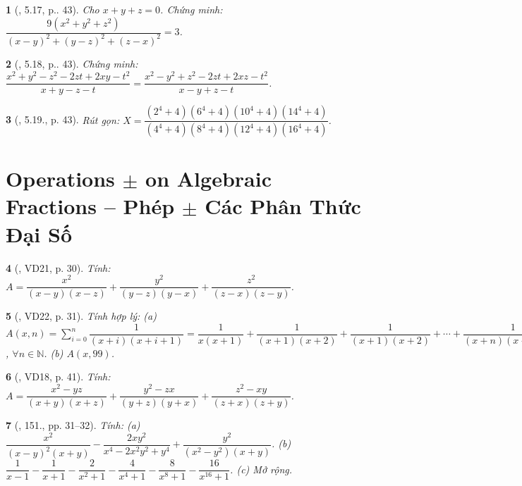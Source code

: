 \documentclass{article}
\newtheorem{baitoan}{}
\begin{document}
\begin{baitoan}[\cite{TLCT_THCS_Toan_8_dai_so}, 5.17, p.. 43]
	Cho $x + y + z = 0$. Chứng minh: $\dfrac{9(x^2 + y^2 + z^2)}{(x - y)^2 + (y - z)^2 + (z - x)^2} = 3$.
\end{baitoan}

\begin{baitoan}[\cite{TLCT_THCS_Toan_8_dai_so}, 5.18, p.. 43]
	Chứng minh: $\dfrac{x^2 + y^2 - z^2 - 2zt + 2xy - t^2}{x + y - z - t} = \dfrac{x^2 - y^2 + z^2 - 2zt + 2xz - t^2}{x - y + z - t}$.
\end{baitoan}

\begin{baitoan}[\cite{TLCT_THCS_Toan_8_dai_so}, 5.19., p. 43]
	Rút gọn: $X = \dfrac{(2^4 + 4)(6^4 + 4)(10^4 + 4)(14^4 + 4)}{(4^4 + 4)(8^4 + 4)(12^4 + 4)(16^4 + 4)}$.
\end{baitoan}


\section{Operations $\pm$ on Algebraic Fractions -- Phép $\pm$ Các Phân Thức Đại Số}

\begin{baitoan}[\cite{Tuyen_Toan_8}, VD21, p. 30]
	Tính: $A = \dfrac{x^2}{(x - y)(x - z)} + \dfrac{y^2}{(y - z)(y - x)} + \dfrac{z^2}{(z - x)(z - y)}$.
\end{baitoan}

\begin{baitoan}[\cite{Tuyen_Toan_8}, VD22, p. 31]
	Tính hợp lý: (a) $A(x,n) = \sum_{i=0}^n \dfrac{1}{(x + i)(x + i + 1)} = \dfrac{1}{x(x + 1)} + \dfrac{1}{(x + 1)(x + 2)} + \dfrac{1}{(x + 1)(x + 2)} + \cdots + \dfrac{1}{(x + n)(x + n + 1)}$, $\forall n\in\mathbb{N}$. (b) $A(x,99)$.
\end{baitoan}

\begin{baitoan}[\cite{Tuyen_Toan_8_old}, VD18, p. 41]
	Tính: $A = \dfrac{x^2 - yz}{(x + y)(x + z)} + \dfrac{y^2 - zx}{(y + z)(y + x)} + \dfrac{z^2 - xy}{(z + x)(z + y)}$.
\end{baitoan}

\begin{baitoan}[\cite{Tuyen_Toan_8}, 151., pp. 31--32]
	Tính: (a) $\dfrac{x^2}{(x - y)^2(x + y)} - \dfrac{2xy^2}{x^4 - 2x^2y^2 + y^4} + \dfrac{y^2}{(x^2 - y^2)(x + y)}$. (b) $\dfrac{1}{x - 1} - \dfrac{1}{x + 1} - \dfrac{2}{x^2 + 1} - \dfrac{4}{x^4 + 1} - \dfrac{8}{x^8 + 1} - \dfrac{16}{x^{16} + 1}$. (c) Mở rộng.
\end{baitoan}
\end{document}
